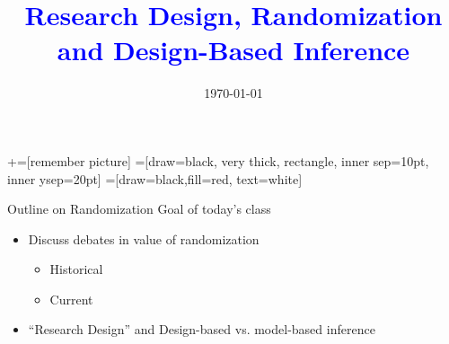 \documentclass[notes,11pt, aspectratio=169]{beamer}
\title[]{\textcolor{blue}{Research Design, Randomization and Design-Based Inference }}
\author[PGP]{}
\institute[FRBNY]{\small{Paul Goldsmith-Pinkham}}
\date{\today}
\begin{document}
\newcommand\marktopleft[1]{%
    \tikz[overlay,remember picture] 
        \node (marker-#1-a) at (-.3em,.3em) {};%
}
\newcommand\markbottomright[2]{%
    \tikz[overlay,remember picture] 
        \node (marker-#1-b) at (0em,0em) {};%
}
+=[remember picture] 
 =[draw=black, very thick, rectangle, inner sep=10pt, inner ysep=20pt]
 =[draw=black,fill=red, text=white]

\begin{frame}
\maketitle

\end{frame}

\begin{frame}{Outline on Randomization}
  Goal of today's class
  \begin{itemize}
  \item Discuss debates in value of randomization
    \begin{itemize}
    \item Historical
    \item Current
    \end{itemize}
  \item ``Research Design'' and Design-based vs. model-based inference 
  \end{itemize}
\end{frame}
\end{document}
